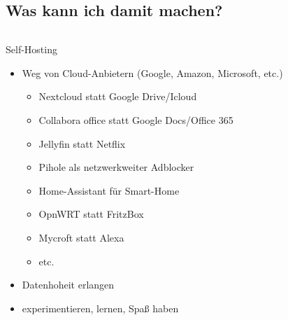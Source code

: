 \documentclass[
    ngerman,
    accentcolor=3b,
    fontsize= 12pt,
    a4paper,
    aspectratio=169,
    colorback=true,
    fancy_row_colors,
    leqno,
    fleqn,
    boxarc=3pt,
    fleqn,
    main,
    design=2008,
]{algoslides}
\begin{document}
    \subsection{Was kann ich damit machen?}
    \begin{frame}
        \slidehead{}
        \vspace{-1em}
        \begin{columns}[c]
            \begin{column}{.5\textwidth}
                Self-Hosting
                \begin{itemize}
                    \item Weg von Cloud-Anbietern (Google, Amazon, Microsoft, etc.)
                        \begin{itemize}
                            \item Nextcloud statt Google Drive/Icloud
                            \item Collabora office statt Google Docs/Office 365
                            \item Jellyfin statt Netflix
                            \item Pihole als netzwerkweiter Adblocker
                            \item Home-Assistant für Smart-Home
                            \item OpnWRT statt FritzBox
                            \item Mycroft statt Alexa
                            \item etc.
                        \end{itemize}
                    \item Datenhoheit erlangen
                    \item experimentieren, lernen, Spaß haben
                \end{itemize}
            \end{column}%
            \begin{column}{.5\textwidth}
                \begin{figure}[ht!]
                    \centering

\end{figure}
\end{column}
\end{columns}
\end{frame}
\end{document}
